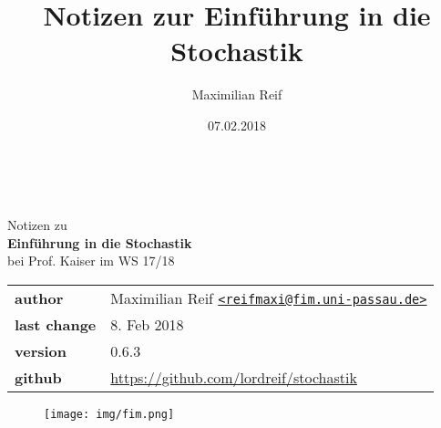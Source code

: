 \documentclass[11pt,a4paper,ngerman]{article}
\date{07.02.2018}
\author{Maximilian Reif}
\title{Notizen zur Einführung in die Stochastik}
\newcommand{\1}{\mathbbm{1}}
\begin{document}
\begin{titlepage}
    \ \newline\newline\newline\newline\newline
	
	\begin{center}

		\huge Notizen zu\\
		\Huge\textbf{Einführung in die Stochastik}\\
		\huge bei Prof. Kaiser im WS 17/18\\
		\normalsize

		\vspace{1cm}
		\begin{tabular}[b]{l|l}
			\textbf{author} 		& Maximilian Reif
			\texttt{\href{mailto:reifmaxi@fim.uni-passau.de}
			{<reifmaxi@fim.uni-passau.de>}}\\
			\textbf{last change}	& 8. Feb 2018 \\
			\textbf{version} 	& 0.6.3\\
			\textbf{github} 		& \url{https://github.com/lordreif/stochastik}
		\end{tabular}
		\vspace{1cm}
		
	\end{center}
	
	\begin{figure}[b]
	\centering
	\texttt{[image: img/fim.png]}
	\end{figure}
	
\end{titlepage}

%

\newpage
\tableofcontents\thispagestyle{empty}
\newpage

\setcounter{page}{1}




%
%

\end{document}
